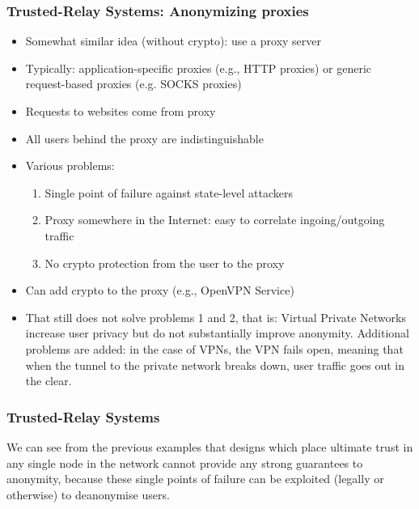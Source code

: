 \begin{frame}
  \frametitle{Trusted-Relay Systems: Anonymizing proxies}
  \begin{itemize}
    \item Somewhat similar idea (without crypto): use a proxy server
    \item Typically: application-specific proxies (e.g., HTTP proxies) or
      generic request-based proxies (e.g. SOCKS proxies)
    \item Requests to websites come from proxy 
    \item All users behind the proxy are indistinguishable
    \item Various problems:
      \begin{enumerate}
        \item Single point of failure against state-level attackers
        \item<2-> Proxy somewhere in the Internet: easy to correlate ingoing/outgoing traffic
        \item<3-> No crypto protection from the user to the proxy
      \end{enumerate}
    \item<4-> Can add crypto to the proxy (e.g., OpenVPN Service)
    \item<4-> That still does not solve problems 1 and 2, that is: Virtual
      Private Networks increase user privacy but do not substantially improve
      anonymity. Additional problems are added: in the case of VPNs, the VPN
      fails open, meaning that when the tunnel to the private network breaks
      down, user traffic goes out in the clear.
  \end{itemize}
\end{frame}


\begin{frame}
  \frametitle{Trusted-Relay Systems}

  We can see from the previous examples that designs which place ultimate trust
  in any single node in the network cannot provide any strong guarantees to
  anonymity, because these single points of failure can be exploited (legally or
  otherwise) to deanonymise users.
\end{frame}




